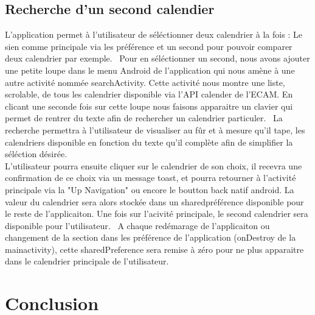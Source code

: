 \documentclass{article}
\begin{document}
	\subsection{Recherche d'un second calendier}
		L'application permet à l'utilisateur de séléctionner deux calendrier à la fois : Le sien comme principale via les préférence et
		un second pour pouvoir comparer deux calendrier par exemple.  \
		Pour en séléctionner un second, nous avons ajouter une petite loupe dans le menu Android de l'application qui nous amène à une autre
		activité nommée searchActivity. Cette activité nous montre une liste, scrolable, de tous les calendrier disponible via l'API calender de l'ECAM.
		En clicant une seconde fois sur cette loupe nous faisons apparaitre un clavier qui permet de rentrer du texte afin de rechercher
		un calendrier particuler. \
		La recherche permettra à l'utilisateur de visualiser au fûr et à mesure qu'il tape, les calendriers disponible en fonction du
		texte qu'il complète afin de simplifier la séléction désirée. \\
		L'utilisateur pourra ensuite cliquer  sur le calendrier de son choix, il recevra une confirmation de ce choix via un message toast,
		et pourra retourner à l'activité principale via la "Up Navigation" ou encore le boutton back natif android. La valeur du calendrier
		sera alors stockée dans un sharedpréférence disponible pour le reste de l'applicaiton.
		Une fois sur l'acivité principale, le second calendrier sera disponible pour l'utilisateur. \
		A chaque redémarage de l'applicaiton ou changement de la section dans les préférence de l'application (onDestroy de la mainactivity),
		cette sharedPreference sera remise à zéro pour ne plus apparaitre dans le calendrier principale de l'utilisateur.

	\section{Conclusion}
	\hspace{0.45cm}
		
\end{document}
